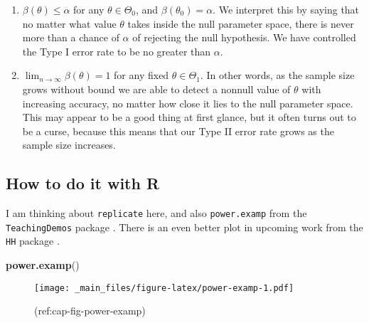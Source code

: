 \documentclass[]{book}
\newenvironment{Shaded}{\begin{snugshade}}{\end{snugshade}}
\newcommand{\KeywordTok}[1]{\textcolor[rgb]{0.13,0.29,0.53}{\textbf{{#1}}}}
\newcommand{\NormalTok}[1]{{#1}}
\providecommand{\tightlist}{%
  \setlength{\itemsep}{0pt}\setlength{\parskip}{0pt}}
\numberwithin{equation}{chapter}
\numberwithin{figure}{chapter}
\theoremstyle{plain}
\theoremstyle{definition}
\theoremstyle{remark}
\theoremstyle{definition}
\theoremstyle{definition}
\theoremstyle{remark}
\begin{document}
\begin{enumerate}
\def\labelenumi{\arabic{enumi}.}
\tightlist
\item
  \(\beta(\theta)\leq\alpha\) for any \(\theta\in\Theta_{0}\), and
  \(\beta(\theta_{0})=\alpha\). We interpret this by saying that no
  matter what value \(\theta\) takes inside the null parameter space,
  there is never more than a chance of \(\alpha\) of rejecting the null
  hypothesis. We have controlled the Type I error rate to be no greater
  than \(\alpha\).
\item
  \(\lim_{n\to\infty}\beta(\theta)=1\) for any fixed
  \(\theta\in\Theta_{1}\). In other words, as the sample size grows
  without bound we are able to detect a nonnull value of \(\theta\) with
  increasing accuracy, no matter how close it lies to the null parameter
  space. This may appear to be a good thing at first glance, but it
  often turns out to be a curse, because this means that our Type II
  error rate grows as the sample size increases.
\end{enumerate}

\subsection{How to do it with R}\label{how-to-do-it-with-r-46}

I am thinking about \texttt{replicate}
 here, and also \texttt{power.examp}
 from the \texttt{TeachingDemos}
package \cite{TeachingDemos}. There is an even better plot in upcoming
work from the \texttt{HH} package \cite{HH}.

\begin{Shaded}
\begin{Highlighting}[]
\KeywordTok{power.examp}\NormalTok{()}
\end{Highlighting}
\end{Shaded}

\begin{figure}[htbp]
\centering
\texttt{[image: \_main\_files/figure-latex/power-examp-1.pdf]}
\caption{\label{fig:power-examp}(ref:cap-fig-power-examp)}
\end{figure}
\end{document}
